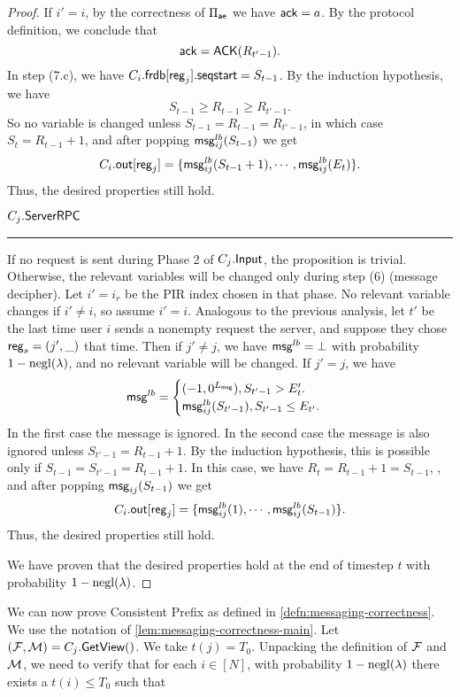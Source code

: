 \begin{proof}
If $i' = i$, by the correctness of $\Pi_{\mathsf{ae}}$ we have $\mathsf{ack} = a$. By the protocol definition, we conclude that
$$\mathsf{ack} = \mathsf{ACK}(R_{t' - 1}).$$
In step (7.c), we have $C_i.\mathsf{frdb}[\mathsf{reg}_j].\mathsf{seqstart} = S_{t - 1}$. By the induction hypothesis, we have
$$S_{t - 1} \geq R_{t - 1} \geq R_{t' - 1}.$$
So no variable is changed unless $S_{t - 1} = R_{t - 1} = R_{t' - 1}$, in which case $S_t = R_{t - 1} + 1$, and after popping $\mathsf{msg}^{lb}_{ij}(S_{t - 1})$ we get
$$C_i.\mathsf{out}[\mathsf{reg}_j] = \{\mathsf{msg}^{lb}_{ij}(S_{t - 1} + 1), \cdots, \mathsf{msg}^{lb}_{ij}(E_t)\}.$$
Thus, the desired properties still hold.

\vspace{10pt}
$C_j.\mathsf{ServerRPC}$
\hrule
If no request is sent during Phase 2 of $C_j.\mathsf{Input}$, the proposition is trivial. Otherwise, the relevant variables will be changed only during step (6) (message decipher). Let $i' = i_r$ be the PIR index chosen in that phase. No relevant variable changes if $i' \neq i$, so assume $i' = i$. Analogous to the previous analysis, let $t'$ be the last time user $i$ sends a nonempty request the server, and suppose they chose $\mathsf{reg}_s = (j', \_)$ that time. Then
if $j' \neq j$, we have $\mathsf{msg}^{lb} = \bot$ with probability $1 - \operatorname{negl}(\lambda)$, and no relevant variable will be changed. If $j' = j$, we have
$$\mathsf{msg}^{lb} = \begin{cases}
(-1, 0^{L_{\mathsf{msg}}}), S_{t' - 1} > E_t'. \\
\mathsf{msg}_{ij}^{lb}(S_{t' - 1}), S_{t' - 1} \leq E_{t'}. 
\end{cases}$$
In the first case the message is ignored. In the second case the message is also ignored unless $S_{t' - 1} = R_{t - 1} + 1$. By the induction hypothesis, this is possible only if $S_{t - 1} = S_{t' - 1} = R_{t - 1} + 1$. In this case, we have $R_t = R_{t - 1} + 1 = S_{t - 1}$, , and after popping $\mathsf{msg}_{ij}(S_{t - 1})$ we get
$$C_i.\mathsf{out}[\mathsf{reg}_j] = \{\mathsf{msg}^{lb}_{ij}(1), \cdots, \mathsf{msg}^{lb}_{ij}(S_{t - 1})\}.$$
Thus, the desired properties still hold.

We have proven that the desired properties hold at the end of timestep $t$ with probability $1 - \operatorname{negl}(\lambda)$.
\end{proof}
We can now prove Consistent Prefix as defined in \cref{defn:messaging-correctness}. We use the notation of \cref{lem:messaging-correctness-main}. Let $(\mathcal{F}, \mathcal{M}) = C_j.\mathsf{GetView}()$. We take $t(j) = T_0$. Unpacking the definition of $\mathcal{F}$ and $\mathcal{M}$, we need to verify that for each $i \in [N]$, with probability $1 - \operatorname{negl}(\lambda)$ there exists a $t(i) \leq T_0$ such that
 
